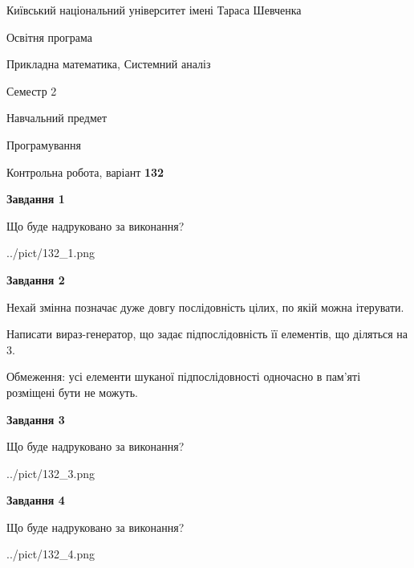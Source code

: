 \documentclass[12pt, ukrainian]{article}
\begin{document}
{{\begin {small}\par
{ \center  Київський національний університет імені Тараса Шевченка \par}
{\parbox {5 cm}{Освітня програма \hfill}{\parbox {8 cm}{Прикладна математика, Системний аналіз \hfill}}\parbox {5 cm}{\hfill Семестр 2}}\par
{\parbox {5 cm} {Навчальний предмет \hfill}\parbox {7 cm}{Програмування \hfill}\parbox {6cm}{\hfill}\par}\vspace{-7pt} \end{small}}{\center Контрольна робота, варіант  \No \textbf
{ 132 }\par}}
{
\begin {large}
{\begin {center}\textbf{Завдання 1}\end {center}}\par
Що буде надруковано за виконання?\par\par
\begin{center}
	{../pict/132_1.png}
\end{center}
\newpage

{\begin {center}\textbf{Завдання 2}\end {center}}\par
Нехай змінна  позначає дуже довгу послідовність цілих, по якій можна ітерувати.

Написати вираз-генератор, що задає підпослідовність її елементів, що діляться на 3.

Обмеження: усі елементи шуканої підпослідовності одночасно в пам'яті розміщені бути не можуть.\par
\newpage

{\begin {center}\textbf{Завдання 3}\end {center}}\par
Що буде надруковано за виконання?
\begin{center}
	{../pict/132_3.png}
\end{center}
\newpage

{\begin {center}\textbf{Завдання 4}\end {center}}\par
Що буде надруковано за виконання?\par
\begin{center}
	{../pict/132_4.png}
\end{center}
\newpage


\end{large}}
\end{document}
